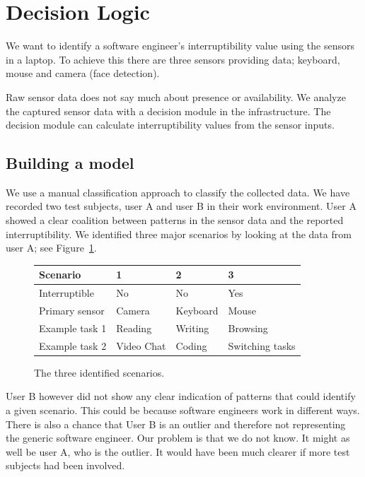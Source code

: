 \documentclass{sigchi}
\begin{document}
\section{Decision Logic}
\label{sec:decision_logic}
We want to identify a software engineer's interruptibility value using the sensors in a laptop.
To achieve this there are three sensors providing data; keyboard, mouse and camera (face detection).

Raw sensor data does not say much about presence or availability.
We analyze the captured sensor data with a decision module in the infrastructure.
The decision module can calculate interruptibility values from the sensor inputs.

\subsection{Building a model}
We use a manual classification approach to classify the collected data.
We have recorded two test subjects, user A and user B in their work environment.
User A showed a clear coalition between patterns in the sensor data and the reported interruptibility.
We identified three major scenarios by looking at the data from user A; see  Figure~\ref{fig:scenarios}.

\begin{figure}[H]
  \centering
      \begin{tabular}{@{}llll@{}}
      \toprule
      \textbf{Scenario} & \textbf{1} & \textbf{2} & \textbf{3}      \\ \midrule
      Interruptible     & No         & No         & Yes             \\
      Primary sensor    & Camera     & Keyboard   & Mouse           \\
      Example task 1    & Reading    & Writing    & Browsing        \\
      Example task 2    & Video Chat & Coding     & Switching tasks \\ \bottomrule
      \end{tabular}
  \caption{The three identified scenarios.}
  \label{fig:scenarios}
\end{figure}

User B however did not show any clear indication of patterns that could identify a given scenario.
This could be because software engineers work in different ways.
There is also a chance that User B is an outlier and therefore not representing the generic software engineer.
Our problem is that we do not know.
It might as well be user A, who is the outlier.
It would have been much clearer if more test subjects had been involved.
\end{document}
